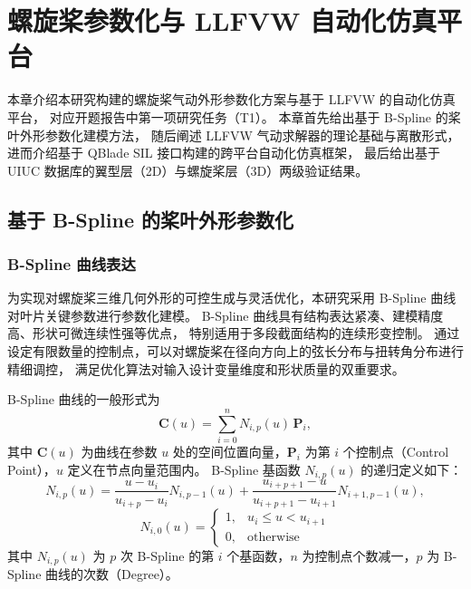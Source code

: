 
\chapter{螺旋桨参数化与 LLFVW 自动化仿真平台}
\label{chap:simulation}

本章介绍本研究构建的螺旋桨气动外形参数化方案与基于 LLFVW 的自动化仿真平台，
对应开题报告中第一项研究任务（T1）。
本章首先给出基于 B-Spline 的桨叶外形参数化建模方法，
随后阐述 LLFVW 气动求解器的理论基础与离散形式，
进而介绍基于 QBlade SIL 接口构建的跨平台自动化仿真框架，
最后给出基于 UIUC 数据库的翼型层（2D）与螺旋桨层（3D）两级验证结果。

\section{基于 B-Spline 的桨叶外形参数化}

\subsection{B-Spline 曲线表达}

为实现对螺旋桨三维几何外形的可控生成与灵活优化，本研究采用 B-Spline 曲线对叶片关键参数进行参数化建模。
B-Spline 曲线具有结构表达紧凑、建模精度高、形状可微连续性强等优点，
特别适用于多段截面结构的连续形变控制。
通过设定有限数量的控制点，可以对螺旋桨在径向方向上的弦长分布与扭转角分布进行精细调控，
满足优化算法对输入设计变量维度和形状质量的双重要求。

B-Spline 曲线的一般形式为
\begin{equation}
\mathbf{C}(u) = \sum_{i=0}^{n} N_{i,p}(u)\,\mathbf{P}_i,
\end{equation}
其中 $\mathbf{C}(u)$ 为曲线在参数 $u$ 处的空间位置向量，$\mathbf{P}_i$ 为第 $i$ 个控制点（Control Point），$u$ 定义在节点向量范围内。
B-Spline 基函数 $N_{i,p}(u)$ 的递归定义如下：
\begin{equation}
N_{i,p}(u) = \frac{u - u_i}{u_{i+p} - u_i} N_{i,p-1}(u) + \frac{u_{i+p+1} - u}{u_{i+p+1} - u_{i+1}} N_{i+1,p-1}(u),
\end{equation}
\begin{equation}
N_{i,0}(u) = \begin{cases} 1, & u_i \leq u < u_{i+1} \\ 0, & \text{otherwise} \end{cases}
\end{equation}
其中 $N_{i,p}(u)$ 为 $p$ 次 B-Spline 的第 $i$ 个基函数，$n$ 为控制点个数减一，$p$ 为 B-Spline 曲线的次数（Degree）。

